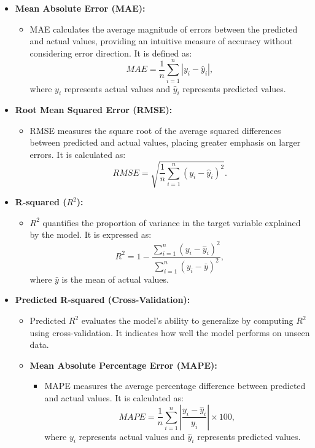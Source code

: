 \documentclass[10pt,twocolumn]{article}
\begin{document}
\begin{itemize}
    \item \textbf{Mean Absolute Error (MAE):}
    \begin{itemize}
        \item MAE calculates the average magnitude of errors between the predicted and actual values, providing an intuitive measure of accuracy without considering error direction. It is defined as:
        \[
        MAE = \frac{1}{n} \sum_{i=1}^n |y_i - \hat{y}_i|,
        \]
        where \( y_i \) represents actual values and \( \hat{y}_i \) represents predicted values.\cite{20}
    \end{itemize}

    \item \textbf{Root Mean Squared Error (RMSE):}
    \begin{itemize}
        \item RMSE measures the square root of the average squared differences between predicted and actual values, placing greater emphasis on larger errors.\cite{20} It is calculated as:
        \[
        RMSE = \sqrt{\frac{1}{n} \sum_{i=1}^n (y_i - \hat{y}_i)^2}.
        \]
    \end{itemize}

    \item \textbf{R-squared (\( R^2 \)):}
    \begin{itemize}
        \item  \( R^2 \) quantifies the proportion of variance in the target variable explained by the model.\cite{20} It is expressed as:
        \[
        R^2 = 1 - \frac{\sum_{i=1}^n (y_i - \hat{y}_i)^2}{\sum_{i=1}^n (y_i - \bar{y})^2},
        \]
        where \( \bar{y} \) is the mean of actual values.
    \end{itemize}

    \item \textbf{Predicted R-squared (Cross-Validation):}
    \begin{itemize}
        \item  Predicted \( R^2 \) evaluates the model's ability to generalize by computing \( R^2 \) using cross-validation. It indicates how well the model performs on unseen data.\cite{20}
    \end{itemize}
\begin{itemize}
    \item \textbf{Mean Absolute Percentage Error (MAPE):}
    \begin{itemize}
        \item  MAPE measures the average percentage difference between predicted and actual values.\cite{20} It is calculated as:
        \[
        MAPE = \frac{1}{n} \sum_{i=1}^n \left| \frac{y_i - \hat{y}_i}{y_i} \right| \times 100,
        \]
        where \( y_i \) represents actual values and \( \hat{y}_i \) represents predicted values.
    \end{itemize}


\end{itemize}
\end{itemize}
\end{document}
